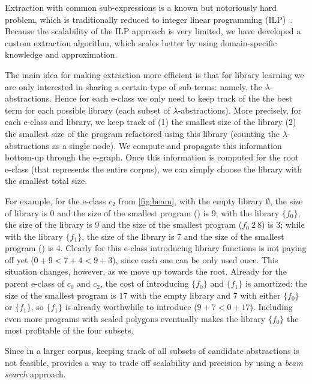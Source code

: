Extraction with common sub-expressions is a known but notoriously hard problem,
which is traditionally reduced to integer linear programming (ILP)~\cite{tensat,spores}.
%
Because the scalability of the ILP approach is very limited,
we have developed a custom extraction algorithm,
which scales better by using domain-specific knowledge and approximation.


%
The main idea for making extraction more efficient is that
for library learning we are only interested in sharing a certain type of sub-terms:
namely, the $\lambda$-abstractions.
%
Hence for each e-class we only need to keep track
of the the best term for each possible library
(\ie each subset of $\lambda$-abstractions).
%
More precisely, for each e-class and library,
we keep track of
  (1) the smallest size of the library
  (2) the smallest size of the program refactored using this library 
  (counting the $\lambda$-abstractions as a single node).
%
We compute and propagate this information bottom-up through the e-graph.
%
Once this information is computed for the root e-class
(that represents the entire corpus),
we can simply choose the library with the smallest total size.

For example, for the e-class $c_2$ from \autoref{fig:beam},
with the empty library $\emptyset$, the size of library is 0 and the size of the smallest program () is 9;
with the library $\{f_0\}$, the size of the library is 9 and the size of the smallest program ($f_0\ 2\ 8$) is 3;
while with the library $\{f_1\}$, the size of the library is 7 and the size of the smallest program () is 4.
%
Clearly for this e-class introducing library functions is not paying off yet ($0 + 9 < 7 + 4 < 9 + 3$),
since each one can be only used once.
%
This situation changes, however, as we move up towards the root.
%
Already for the parent e-class of $c_0$ and $c_2$,
the cost of introducing $\{f_0\}$ and $\{f_1\}$ is amortized:
the size of the smallest program is 17 with the empty library and 7 with either $\{f_0\}$ or $\{f_1\}$,
so $\{f_1\}$ is already worthwhile to introduce ($9 + 7 < 0 + 17$).
%
Including even more programs with scaled polygons eventually makes the library $\{f_0\}$ the most profitable of the four subsets.

Since in a larger corpus, keeping track of all subsets of candidate abstractions is not feasible,
\tool provides a way to trade off scalability and precision
by using a \emph{beam search} approach.


